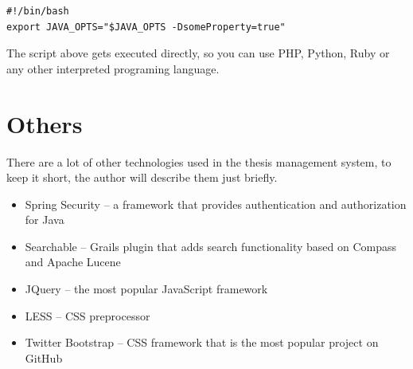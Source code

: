 \begin{verbatim}
#!/bin/bash
export JAVA_OPTS="$JAVA_OPTS -DsomeProperty=true"
\end{verbatim}

The script above gets executed directly, so you can use PHP, Python, Ruby or any other interpreted programing language.

\section{Others}

There are a lot of other technologies used in the thesis management system, to keep it short, the author will describe them just briefly.

\begin{itemize}
    \item Spring Security -- a framework that provides authentication and authorization for Java
    \item Searchable -- Grails plugin that adds search functionality based on Compass and Apache Lucene\cite{searchable-documentation}
    \item JQuery -- the most popular JavaScript framework
    \item LESS -- CSS preprocessor
    \item Twitter Bootstrap -- CSS framework that is the most popular project on GitHub
\end{itemize}

